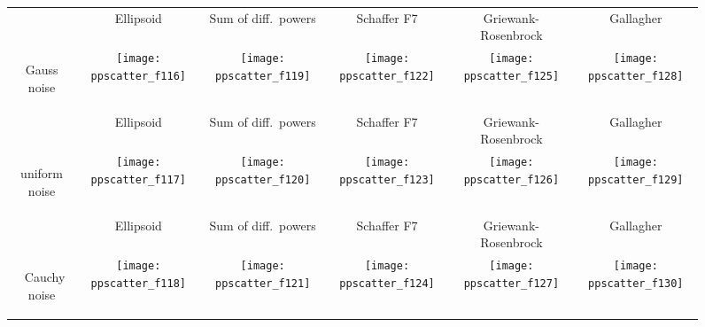 \documentclass{sig-alternate}
\newcommand{\Df}{\ensuremath{\Delta f}}
\begin{document}
\begin{figure*}
\begin{tabular}{@{}c@{}*{5}{@{}c@{}}}
 & { Ellipsoid} & { Sum of diff.\ powers} & { Schaffer F7} & { Griewank-Rosenbrock} & { Gallagher}\\
\begin{turn}{90}\parbox{0.175\textwidth}{\centering\sf Gauss noise}\end{turn} &
    \texttt{[image: ppscatter\_f116]}&
    \texttt{[image: ppscatter\_f119]}&
    \texttt{[image: ppscatter\_f122]}&
    \texttt{[image: ppscatter\_f125]}&
    \texttt{[image: ppscatter\_f128]}\\
 & { Ellipsoid} & { Sum of diff.\ powers} & { Schaffer F7} & { Griewank-Rosenbrock} & { Gallagher}\\
\begin{turn}{90}\parbox{0.175\textwidth}{\centering\sf uniform noise}\end{turn} &
    \texttt{[image: ppscatter\_f117]}&
    \texttt{[image: ppscatter\_f120]}&
    \texttt{[image: ppscatter\_f123]}&
    \texttt{[image: ppscatter\_f126]}&
    \texttt{[image: ppscatter\_f129]}\\
& { Ellipsoid} & { Sum of diff.\ powers} & { Schaffer F7} & { Griewank-Rosenbrock} & { Gallagher}\\
\begin{turn}{90}\parbox{0.175\textwidth}{~\centering\sf Cauchy noise}\end{turn} &
    \texttt{[image: ppscatter\_f118]}&
    \texttt{[image: ppscatter\_f121]}&
    \texttt{[image: ppscatter\_f124]}&
    \texttt{[image: ppscatter\_f127]}&
    \texttt{[image: ppscatter\_f130]}
\end{tabular}
\caption{\label{fig:scatterplots}
}
\end{figure*}
\end{document}
